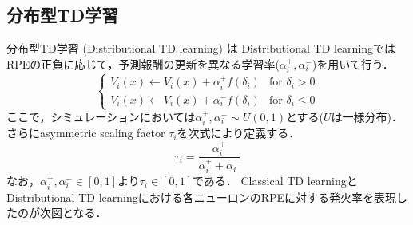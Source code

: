 \subsection{分布型TD学習}分布型TD学習 (Distributional TD learning) は
Distributional TD learningではRPEの正負に応じて，予測報酬の更新を異なる学習率($\alpha_{i}^{+}, \alpha_{i}^{-}$)を用いて行う． 
$$ 
\begin{cases} V_{i}(x) \leftarrow V_{i}(x)+\alpha_{i}^{+} f\left(\delta_{i}\right) &\text{for }
\delta_{i} \gt 0\\ V_{i}(x) \leftarrow V_{i}(x)+\alpha_{i}^{-} f\left(\delta_{i}\right) &\text{for } \delta_{i} \leq 0 \end{cases} 
$$ 
ここで，シミュレーションにおいては$\alpha_{i}^{+}, \alpha_{i}^{-}\sim U(0,
1)$とする($U$は一様分布)．さらにasymmetric scaling factor $\tau_i$を次式により定義する． 
$$ 
\tau_i=\frac{\alpha_{i}^{+}}{\alpha_{i}^{+}+ \alpha_{i}^{-}} 
$$ 
なお，$\alpha_{i}^{+}, \alpha_{i}^{-}\in [0, 1]$より$\tau_i \in
[0,1]$である． 
Classical TD learningとDistributional TD learningにおける各ニューロンのRPEに対する発火率を表現したのが次図となる．
